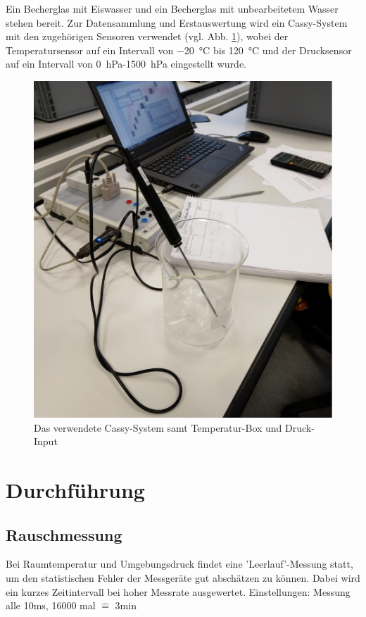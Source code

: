 \documentclass[]{article}
\begin{document}
Ein Becherglas mit Eiswasser und ein Becherglas mit unbearbeitetem Wasser stehen bereit. Zur Datensammlung und Erstauswertung wird ein Cassy-System mit den zugehörigen Sensoren verwendet (vgl. Abb. \ref{Cassy}), wobei der Temperatursensor auf ein Intervall von \SI{-20}{\celsius} bis \SI{120}{\celsius} und der Drucksensor auf ein Intervall von \SI{0}{\hecto\pascal}-\SI{1500}{\hecto\pascal} eingestellt wurde.
\begin{figure}
	\begin{center}
		\includegraphics[scale=0.33]{Images/Cassy.jpg}
		\caption{Das verwendete Cassy-System samt Temperatur-Box und Druck-Input}
		\label{Cassy}
	\end{center}
\end{figure}


\section{Durchführung}
\subsection{Rauschmessung}
Bei Raumtemperatur und Umgebungsdruck findet eine 'Leerlauf'-Messung statt, um den statistischen Fehler der Messgeräte gut abschätzen zu können. Dabei wird ein kurzes Zeitintervall bei hoher Messrate ausgewertet. 
Einstellungen: Messung alle 10ms, 16000 mal $\widehat{=}$ 3min
\end{document}
